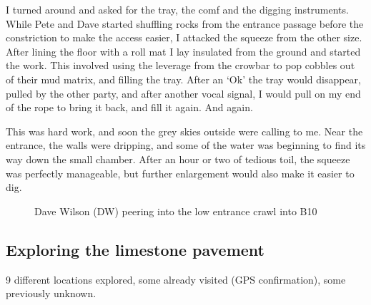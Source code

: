 I turned around and asked for the tray, the comf and the digging instruments. While Pete and Dave started shuffling rocks from the entrance passage before the constriction to make the access easier, I attacked the squeeze from the other size. After lining the floor with a roll mat I lay insulated from the ground and started the work. This involved using the leverage from the crowbar to pop cobbles out of their mud matrix, and filling the tray. After an `Ok' the tray would disappear, pulled by the other party, and after another vocal signal, I would pull on my end of the rope to bring it back, and fill it again. And again.

This was hard work, and soon the grey skies outside were calling to me. Near the entrance, the walls were dripping, and some of the water was beginning to find its way down the small chamber. After an hour or two of tedious toil, the squeeze was perfectly manageable, but further enlargement would also make it easier to dig.

\begin{figure*}[t!]
	\checkoddpage \ifoddpage \forcerectofloat \else \forceversofloat \fi
	\centering
	\label{dw jailbreak}
	\caption{Dave Wilson (DW) peering into the low entrance crawl into B10 }
\end{figure*}


\subsection{Exploring the limestone pavement}
\label{sec:limestone pavement}
9 different locations explored, some already visited (GPS confirmation), some previously unknown.


